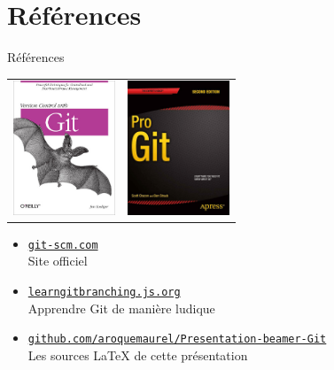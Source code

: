 \documentclass[xcolor=x11names,compress]{beamer}
\begin{document}
\section*{Références}
\begin{frame}{Références}
		\centering
	\begin{tabular}{cc}
		\includegraphics[height=4cm]{images/refs/oreally.jpg}&
		\includegraphics[height=4cm]{images/refs/progit.png}\\
	\end{tabular}
	\vfill
	\begin{itemize}
		\item \footnotesize \texttt{\href{https://git-scm.com}{git-scm.com}}\\
			{Site officiel}
		\item \footnotesize \texttt{\href{https://learngitbranching.js.org}{learngitbranching.js.org}}\\
			{Apprendre Git de manière ludique}
		\item \footnotesize \texttt{\href{https://github.com/aroquemaurel/Presentation-beamer-Git}{github.com/aroquemaurel/Presentation-beamer-Git}}\\
			Les sources \LaTeX{} de cette présentation
	\end{itemize}
\end{frame}


\end{document}
